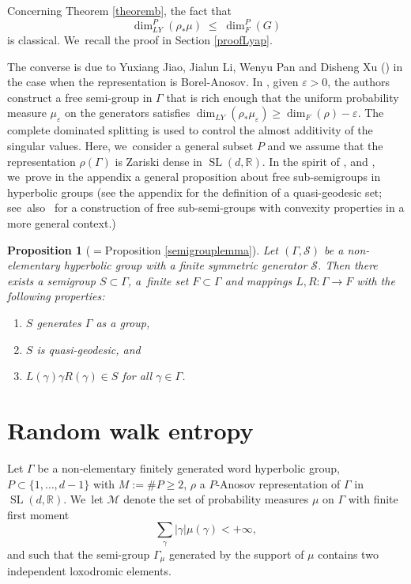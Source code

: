 \documentclass[10pt,a4paper]{amsart}
\newtheorem{proposition}[theorem]{Proposition}
\newcommand{\R}{\mathbb{R}}
\newcommand{\cS}{\mathcal{S}}
\let\e\varepsilon
\let\G\Gamma
\DeclareMathOperator{\SL}{SL}
\begin{document}
Concerning Theorem \ref{theoremb}, the fact that
\begin{equation}\label{LyapleqFalc} \dim_{LY}^P(\rho_*\mu) \; \leq \; \dim_F^P (G) \end{equation} is classical. We~recall the proof in Section \ref{proofLyap}.

The converse is due to Yuxiang Jiao, Jialun Li, Wenyu Pan and Disheng Xu (\cite{JLPX23}) in the case when the representation is Borel-Anosov. In \cite{JLPX23}, given \(\e>0\), the authors construct a free semi-group in \(\G\) that is rich enough that the uniform probability measure \(\mu_\e \) on the generators satisfies \(\dim_{LY}(\rho_*\mu_\e) \ge \dim_F(\rho) -\e\). The complete dominated splitting is used to control the almost additivity of the singular values.
Here, we~consider a general subset \(P\) and we assume that the representation \(\rho(\G)\) is Zariski dense in \(\SL(d,\R)\). In the spirit of \cite{gouezel}, \cite{random} and \cite{JLPX23}, we~prove in the appendix a general proposition about free sub-semigroups in hyperbolic groups (see the appendix for the definition of a quasi-geodesic set; see~also~\cite{yang} for a construction of free sub-semi-groups with convexity properties in a more general context.)
\begin{proposition}[$={}$Proposition \ref{semigrouplemma}]
Let \((\Gamma,\cS)\) be a non-elementary hyperbolic group with a finite symmetric generator \(\cS\). Then there exists a semigroup \(S \subset \Gamma\), a~finite set \(F \subset \Gamma\) and mappings \(L,R:\Gamma \to F\) with the following properties:
\begin{enumerate}
\item \(S\) generates \(\Gamma\) as a group,
\item \(S\) is quasi-geodesic, and
\item \(L(\gamma)\gamma R(\gamma) \in S\) for all \(\gamma \in \Gamma\).
\end{enumerate}
\end{proposition}
\section{Random walk entropy}

Let \(\G\) be a non-elementary finitely generated word hyperbolic group, \(P \subset \lbrace 1,\ldots, d-1 \rbrace\) with \(M:= \#P \ge 2 \), \(\rho \) a \(P\)-Anosov representation of \(\G\) in \(\SL (d,\R) \). We~let \(\mathcal{M}\) denote the set of probability measures \(\mu\) on \(\Gamma\) with finite first moment
\[
\sum_{\gamma} |\gamma| \mu(\gamma) < +\infty,
\]
and such that the semi-group \(\Gamma_\mu\) generated by the support of \(\mu\) contains two independent loxodromic elements.
\end{document}
